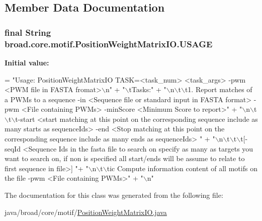 \subsection{Member Data Documentation}
\hypertarget{classbroad_1_1core_1_1motif_1_1_position_weight_matrix_i_o_a38359092dca70423124a62217a9fb189}{
\subsubsection[{U\+S\+A\+G\+E}]{\setlength{\rightskip}{0pt plus 5cm}final String broad.\+core.\+motif.\+Position\+Weight\+Matrix\+I\+O.\+U\+S\+A\+G\+E\hspace{0.3cm}{\ttfamily [static]}}}\label{classbroad_1_1core_1_1motif_1_1_position_weight_matrix_i_o_a38359092dca70423124a62217a9fb189}
{\bfseries Initial value\+:}
\begin{DoxyCode}
= \textcolor{stringliteral}{"Usage: PositionWeightMatrixIO TASK=<task\_num> <task\_args> -pwm <PWM file in FASTA fromat>\(\backslash\)n"} +
    \textcolor{stringliteral}{"\(\backslash\)tTasks:"} +
    \textcolor{stringliteral}{"\(\backslash\)n\(\backslash\)t\(\backslash\)t1. Report matches of a PWMs to a sequence -in <Sequence file or standard input in FASTA format>
       -pwm <File containing PWMs> -minScore <Minimum Score to report>"} +
    \textcolor{stringliteral}{"\(\backslash\)n\(\backslash\)t\(\backslash\)t\(\backslash\)t-start <start matching at this point on the corresponding sequence include as many starts as
       sequenceIds> -end <Stop matching at this point on the corresponding sequence include as many ends as
       sequenceIds> "} +
    \textcolor{stringliteral}{"\(\backslash\)n\(\backslash\)t\(\backslash\)t\(\backslash\)t[-seqId <Sequence Ids in the fasta file to search on specify as many as targets you want to
       search on, if non is specified all start/ends will be assume to relate to first sequence in file>] "}+
    \textcolor{stringliteral}{"\(\backslash\)n\(\backslash\)t\(\backslash\)tic Compute information content of all motifs on the file -pwm <File containing PWMs>"} +
    \textcolor{stringliteral}{"\(\backslash\)n"}
\end{DoxyCode}


The documentation for this class was generated from the following file\+:\begin{DoxyCompactItemize}
\item 
java/broad/core/motif/\hyperlink{_position_weight_matrix_i_o_8java}{Position\+Weight\+Matrix\+I\+O.\+java}\end{DoxyCompactItemize}
